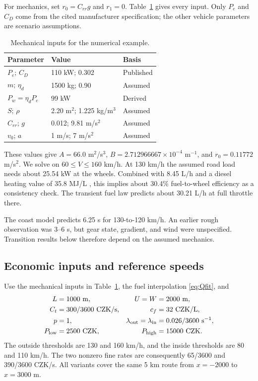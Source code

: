 \documentclass[conference,a4paper]{IEEEtran}
\newcommand{\out}{\mathrm{out}}
\newcommand{\inn}{\mathrm{in}}
\newcommand{\CZK}{\mathrm{CZK}}
\begin{document}
For mechanics, set $r_0=C_{rr}g$ and $r_1=0$. Table~\ref{tab:assumptions} gives every input. Only $P_e$ and $C_D$ come from the cited manufacturer specification; the other vehicle parameters are scenario assumptions.
\begin{table}[!t]
\centering
\caption{Mechanical inputs for the numerical example.}
\label{tab:assumptions}
\begin{tabular}{@{}lll@{}}
\toprule
Parameter & Value & Basis\\
\midrule
$P_e$; $C_D$ & 110 kW; 0.302 & Published \cite{skoda}\\
$m$; $\eta_d$ & 1500 kg; 0.90 & Assumed\\
$P_w=\eta_dP_e$ & 99 kW & Derived\\
$S$; $\rho$ & 2.20 m$^2$; 1.225 kg/m$^3$ & Assumed\\
$C_{rr}$; $g$ & 0.012; 9.81 m/s$^2$ & Assumed\\
$v_0$; $a$ & 1 m/s; 7 m/s$^2$ & Assumed\\
\bottomrule
\end{tabular}
\end{table}
These values give $A=66.0$ m$^2$/s$^3$, $B=2.712966667\times10^{-4}$ m$^{-1}$, and $r_0=0.11772$ m/s$^2$. We solve on $60\le V\le160$ km/h. At 130 km/h the assumed road load needs about 25.54 kW at the wheels. Combined with 8.45 L/h and a diesel heating value of 35.8 MJ/L \cite{diesel}, this implies about 30.4\% fuel-to-wheel efficiency as a consistency check. The transient fuel law predicts about 30.21 L/h at full throttle there.

The coast model predicts 6.25 s for 130-to-120 km/h. An earlier rough observation was 3--6 s, but gear state, gradient, and wind were unspecified. Transition results below therefore depend on the assumed mechanics.

\subsection{Economic inputs and reference speeds}
Use the mechanical inputs in Table~\ref{tab:assumptions}, the fuel interpolation \eqref{eq:Qfit}, and
\begin{align}
L&=1000\ \mathrm{m},&U=W&=2000\ \mathrm{m},\notag\\
C_t&=300/3600\ \CZK/\mathrm{s},&c_f&=32\ \CZK/\mathrm{L},\notag\\
p&=1,&\lambda_{\out}=\lambda_{\inn}&=0.026/3600\ \mathrm{s^{-1}},\notag\\
P_{\mathrm{low}}&=2500\ \CZK,&P_{\mathrm{high}}&=15000\ \CZK.
\end{align}
The outside thresholds are 130 and 160 km/h, and the inside thresholds are 80 and 110 km/h. The two nonzero fine rates are consequently 65/3600 and 390/3600 CZK/s. All variants cover the same 5 km route from $x=-2000$ to $x=3000$ m.
\end{document}
